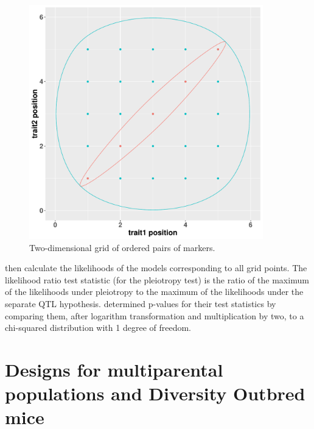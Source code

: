 \documentclass[oneside]{book}\usepackage[]{graphicx}\usepackage[]{color}
\newenvironment{knitrout}{}{} %
\begin{document}
\begin{knitrout}
\color{fgcolor}\begin{figure}
\includegraphics[width=4in,height=4in]{figure/encircle-1} \caption[Two-dimensional grid of ordered pairs of markers]{Two-dimensional grid of ordered pairs of markers.}\label{fig:encircle}
\end{figure}


\end{knitrout}



\citet{jiang1995multiple} then calculate the likelihoods of the models
corresponding to all grid points.
The likelihood ratio test statistic (for the pleiotropy test)
is the ratio of the maximum
of the likelihoods under pleiotropy to the maximum of the likelihoods under
the separate QTL hypothesis. \citet{jiang1995multiple} determined
p-values for their test statistics by comparing
them, after logarithm transformation and multiplication by two,
to a chi-squared distribution with 1 degree of freedom. 


\section{Designs for multiparental populations and Diversity Outbred mice}\label{sec:mpp-designs}
\end{document}
